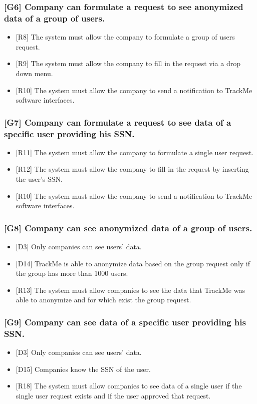 \documentclass{article}
\begin{document}
\subsubsection{[G6] Company can formulate a request to see anonymized data of a group of users.}
\begin{itemize}
\item {[R8]} The system must allow the company to formulate a group of users request.
\item {[R9]} The system must allow the company to fill in the request via a drop down menu.
\item {[R10]} The system must allow the company to send a notification to TrackMe software interfaces.
\end{itemize}
\subsubsection{[G7] Company can formulate a request to see data of a specific user providing his SSN.}
\begin{itemize}
\item {[R11]} The system must allow the company to formulate a single user request.
\item {[R12]} The system must allow the company to fill in the request by inserting the user's SSN.
\item {[R10]} The system must allow the company to send a notification to TrackMe software interfaces.
\end{itemize}
\subsubsection{[G8] Company can see anonymized data of a group of users.}
\begin{itemize}
\item {[D3]} Only companies can see users’ data.
\item {[D14]} TrackMe is able to anonymize data based on the group request only if the group has more than 1000 users.
\item {[R13]} The system must allow companies to see the data that TrackMe was able to anonymize and for which exist the group request.
\end{itemize}
\subsubsection{[G9] Company can see data of a specific user providing his SSN.}
\begin{itemize}
\item {[D3]} Only companies can see users’ data.
\item {[D15]} Companies know the SSN of the user.
\item {[R18]} The system must allow companies to see data of a single user if the single user request exists and if the user approved that request.
\end{itemize}
\end{document}
